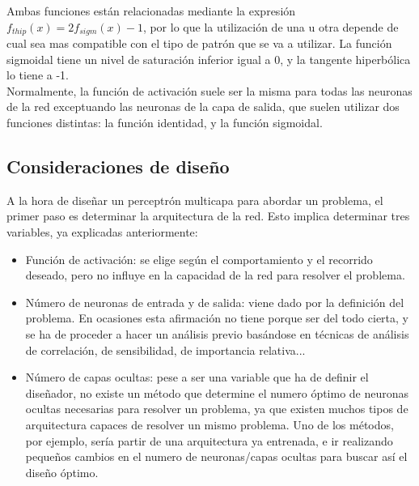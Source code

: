 Ambas funciones están relacionadas mediante la expresión ${f_{thip}(x)=2f_{sigm}(x)-1}$, por lo que la utilización de una u otra depende de cual sea mas compatible con el tipo de patrón que se va a utilizar. La función sigmoidal tiene un nivel de saturación inferior igual a 0, y la tangente hiperbólica lo tiene a -1.\\
Normalmente, la función de activación suele ser la misma para todas las neuronas de la red exceptuando las neuronas de la capa de salida, que suelen utilizar dos funciones distintas: la función identidad, y la función sigmoidal.
\subsection{Consideraciones de diseño}
A la hora de diseñar un perceptrón multicapa para abordar un problema, el primer paso es determinar la arquitectura de la red. Esto implica determinar tres variables, ya explicadas anteriormente:
\begin{itemize}
\item Función de activación: se elige según el comportamiento y el recorrido deseado, pero no influye en la capacidad de la red para resolver el problema.
\item Número de neuronas de entrada y de salida: viene dado por la definición del problema. En ocasiones esta afirmación no tiene porque ser del todo cierta, y se ha de proceder a hacer un análisis previo basándose en técnicas de análisis de correlación, de sensibilidad, de importancia relativa...
\item Número de capas ocultas: pese a ser una variable que ha de definir el diseñador, no existe un método que determine el numero óptimo de neuronas ocultas necesarias para resolver un problema, ya que existen muchos tipos de arquitectura capaces de resolver un mismo problema. Uno de los métodos, por ejemplo, sería partir de una arquitectura ya entrenada, e ir realizando pequeños cambios en el numero de neuronas/capas ocultas para buscar así el diseño óptimo.
\end{itemize}

